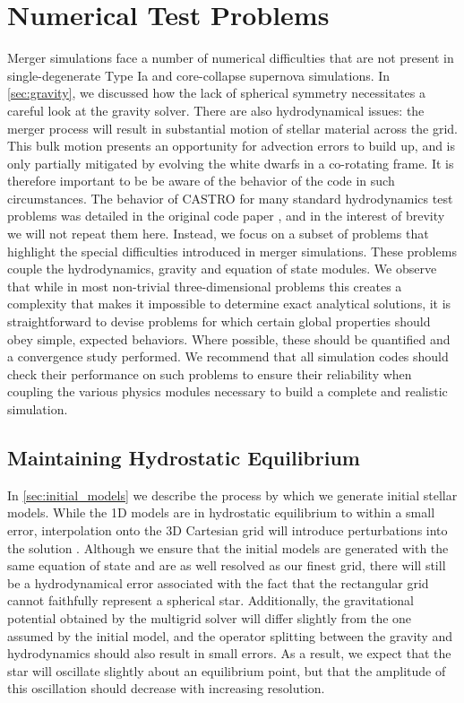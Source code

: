 \documentclass[iop]{../emulateapj}
\begin{document}
\section{Numerical Test Problems}\label{sec:Tests}

Merger simulations face a number of numerical difficulties that are
not present in single-degenerate Type Ia and core-collapse supernova
simulations. In \autoref{sec:gravity}, we discussed how the lack
of spherical symmetry necessitates a careful look at the gravity
solver. There are also hydrodynamical issues: the merger process will
result in substantial motion of stellar material across the grid. This
bulk motion presents an opportunity for advection errors to build up,
and is only partially mitigated by evolving the white dwarfs in a
co-rotating frame. It is therefore important to be be aware of the
behavior of the code in such circumstances. The behavior of CASTRO for
many standard hydrodynamics test problems was detailed in the original
code paper \citep{castro}, and in the interest of brevity we will not
repeat them here. Instead, we focus on a subset of problems that
highlight the special difficulties introduced in merger
simulations. These problems couple the hydrodynamics, gravity and
equation of state modules. We observe that while in most non-trivial
three-dimensional problems this creates a complexity that makes it
impossible to determine exact analytical solutions, it is
straightforward to devise problems for which certain global properties
should obey simple, expected behaviors. Where possible, these should
be quantified and a convergence study performed. We recommend that all
simulation codes should check their performance on such problems to
ensure their reliability when coupling the various physics modules
necessary to build a complete and realistic simulation.

\subsection{Maintaining Hydrostatic Equilibrium}\label{sec:HSE}

In \autoref{sec:initial_models} we describe the process by which
we generate initial stellar models. While the 1D models are in
hydrostatic equilibrium to within a small error, interpolation onto
the 3D Cartesian grid will introduce perturbations into the solution
\citep{zingale:2002}. Although we ensure that the initial models are
generated with the same equation of state and are as well resolved as
our finest grid, there will still be a hydrodynamical error associated
with the fact that the rectangular grid cannot faithfully represent a
spherical star. Additionally, the gravitational potential obtained by
the multigrid solver will differ slightly from the one assumed by the
initial model, and the operator splitting between the gravity and
hydrodynamics should also result in small errors. As a result, we
expect that the star will oscillate slightly about an equilibrium
point, but that the amplitude of this oscillation should decrease with
increasing resolution.
\end{document}
